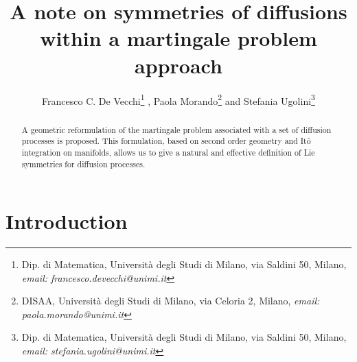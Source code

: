 \documentclass{article}[10pt]
\begin{document}
\title{A note on symmetries of diffusions within a martingale problem approach}
\author{
Francesco C. De Vecchi\thanks{Dip. di Matematica, Universit\`a degli Studi di Milano, via Saldini 50, Milano, \emph{email: francesco.devecchi@unimi.it}} , Paola Morando\thanks{DISAA, Universit\`a degli Studi di Milano, via Celoria 2, Milano, \emph{email: paola.morando@unimi.it}}  and Stefania Ugolini\thanks{Dip. di Matematica, Universit\`a degli Studi di Milano, via Saldini 50, Milano, \emph{email: stefania.ugolini@unimi.it}}
}
\date{}
\maketitle

\begin{abstract}
A geometric reformulation of the martingale problem
associated with a set of diffusion processes is proposed. This formulation,
based on second order geometry and  It\^o integration on
manifolds,
allows us   to give a
natural and effective definition of  Lie symmetries for diffusion
processes.
\end{abstract}

\section{Introduction}
\end{document}
